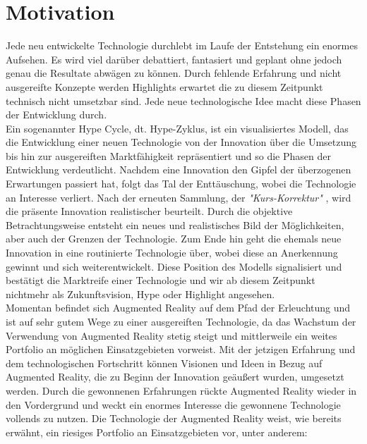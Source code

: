 \section{Motivation}
\label{chap:Motivation}
Jede neu entwickelte Technologie durchlebt im Laufe der Entstehung ein enormes Aufsehen. Es wird viel darüber debattiert, fantasiert 
und geplant ohne jedoch genau die Resultate abwägen zu können. Durch fehlende Erfahrung und nicht ausgereifte Konzepte werden Highlights 
erwartet die zu diesem Zeitpunkt technisch nicht umsetzbar sind. Jede neue technologische Idee macht diese Phasen der Entwicklung durch. 
\\ 
\linebreak
Ein sogenannter Hype Cycle, dt. Hype-Zyklus, ist ein visualisiertes Modell, das die Entwicklung einer neuen Technologie von der 
Innovation über die Umsetzung bis hin zur ausgereiften Marktfähigkeit repräsentiert und so die Phasen der Entwicklung verdeutlicht. 
Nachdem eine Innovation den Gipfel der überzogenen Erwartungen passiert hat, folgt das Tal der Enttäuschung, wobei die Technologie 
an Interesse verliert. Nach der erneuten Sammlung, der \textit{"Kurs-Korrektur"} \cite{hypecycle.2019o}, wird die präsente Innovation 
realistischer beurteilt. Durch die objektive Betrachtungsweise entsteht ein neues und realistisches Bild der Möglichkeiten, aber auch 
der Grenzen der Technologie. Zum Ende hin geht die ehemals neue Innovation in eine routinierte Technologie über, wobei diese an 
Anerkennung gewinnt und sich weiterentwickelt. Diese Position des Modells signalisiert und bestätigt die Marktreife einer Technologie 
und wir ab diesem Zeitpunkt nichtmehr als Zukunftsvision, Hype oder Highlight angesehen.
\\ 
\linebreak
Momentan befindet sich Augmented Reality auf dem Pfad der Erleuchtung und ist auf sehr gutem Wege zu einer ausgereiften Technologie, 
da das Wachstum der Verwendung von Augmented Reality stetig steigt und mittlerweile ein weites Portfolio an möglichen Einsatzgebieten 
vorweist. Mit der jetzigen Erfahrung und dem technologischen Fortschritt können Visionen und Ideen in Bezug auf Augmented Reality, 
die zu Beginn der Innovation geäußert wurden, umgesetzt werden. Durch die gewonnenen Erfahrungen rückte Augmented Reality wieder in 
den Vordergrund und weckt ein enormes Interesse die gewonnene Technologie vollends zu nutzen. Die Technologie der Augmented Reality 
weist, wie bereits erwähnt, ein riesiges Portfolio an Einsatzgebieten vor, unter anderem: 

